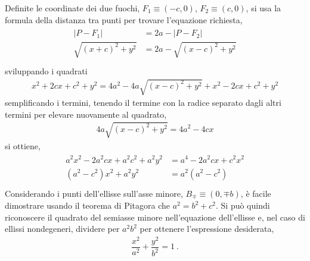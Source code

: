 \documentclass[letterpaper,10pt,english]{jupyterBook}
\begin{document}
\sphinxAtStartPar
Definite le coordinate dei due fuochi, \(F_1 \equiv (-c,0)\), \(F_2 \equiv (c,0)\), si usa la formula della distanza tra punti per trovare l’equazione richiesta,
\begin{equation*}
\begin{split}\begin{aligned}
  |P - F_1|  & = 2 a - |P - F_2| \\
  \sqrt{(x+c)^2 + y^2} & = 2a - \sqrt{(x-c)^2 + y^2} \\
\end{aligned}\end{split}
\end{equation*}
\sphinxAtStartPar
sviluppando i quadrati
\begin{equation*}
\begin{split}x^2 + 2 c x + c^2 + y^2 = 4 a^2 - 4a \sqrt{(x-c)^2 + y^2} + x^2 - 2 c x + c^2 + y^2\end{split}
\end{equation*}
\sphinxAtStartPar
semplificando i termini, tenendo il termine con la radice separato dagli altri termini per elevare nuovamente al quadrato,
\begin{equation*}
\begin{split}4a \sqrt{(x-c)^2 + y^2} = 4 a^2 - 4 c x\end{split}
\end{equation*}
\sphinxAtStartPar
si ottiene,
\begin{equation*}
\begin{split}\begin{aligned}
  a^2 x^2-2 a^2 c x + a^2 c^2 + a^2 y^2 & = a^4 - 2 a^2 c x + c^2 x^2 \\
  (a^2 - c^2)x^2 + a^2 y^2 & = a^2 ( a^2 - c^2 ) \\
\end{aligned}\end{split}
\end{equation*}
\sphinxAtStartPar
Considerando i punti dell’ellisse sull’asse minore, \(B_{\mp} \equiv (0, \mp b)\), è facile dimostrare usando il teorema di Pitagora che \(a^2 = b^2 + c^2\). Si può quindi riconoscere il quadrato del semiasse minore nell’equazione dell’ellisse e, nel caso di ellissi non\sphinxhyphen{}degeneri, dividere per \(a^2 b^2\) per ottenere l’espressione desiderata,
\begin{equation*}
\begin{split}\dfrac{x^2}{a^2} + \dfrac{y^2}{b^2} = 1 \ .\end{split}
\end{equation*}
\end{document}
